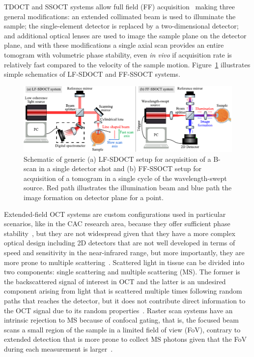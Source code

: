 TDOCT and SSOCT systems allow full field (FF) acquisition~\cite{Dubois2002_Highresolution, Hillmann2016_Aberrationfree} making three general modifications: an extended collimated beam is used to illuminate the sample; the single-element detector is replaced by a two-dimensional detector; and additional optical lenses are used to image the sample plane on the detector plane, and with these modifications a single axial scan provides an entire tomogram with volumetric phase stability, even \textit{in vivo} if acquisition rate is relatively fast compared to the velocity of the sample motion. Figure~\ref{fig:LF_FFOCT_Scheme} illustrates simple schematics of LF-SDOCT and FF-SSOCT systems.

\begin{figure}[htb!]
    \centering
    \includegraphics[width=\textwidth]{Figures/TheoreticalBasis/LF_FFOCT_Scheme.pdf}
    \caption[Schematic of generic LF-SDOCT and FF-OSCT setups.]{Schematic of generic (a) LF-SDOCT setup for acquisition of a B-scan in a single detector shot and (b) FF-SSOCT setup for acquisition of a tomogram in a single cycle of the wavelength-swept source. Red path illustrates the illumination beam and blue path the image formation on detector plane for a point.}
    \label{fig:LF_FFOCT_Scheme}
\end{figure}

Extended-field OCT systems are custom configurations used in particular scenarios, like in the CAC research area, because they offer sufficient phase stability~\cite{Kumar2013_Subaperture, Hillmann2016_Aberrationfree}, but they are not widespread given that they have a more complex optical design including 2D detectors that are not well developed in terms of speed and sensitivity in the near-infrared range, but more importantly, they are more prone to multiple scattering~\cite{Karamata2005_Multiple}. Scattered light in tissue can be divided into two components: single scattering and multiple scattering (MS). The former is the backscattered signal of interest in OCT and the latter is an undesired component arising from light that is scattered multiple times following random paths that reaches the detector, but it does not contribute direct information to the OCT signal due to its random properties~\cite{Karamata2005_Multiple-1}. Raster scan systems have an intrinsic rejection to MS because of confocal gating, that is, the focused beam scans a small region of the sample in a limited field of view (FoV), contrary to extended detection that is more prone to collect MS photons given that the FoV during each measurement is larger~\cite{Karamata2005_Multiple}.

